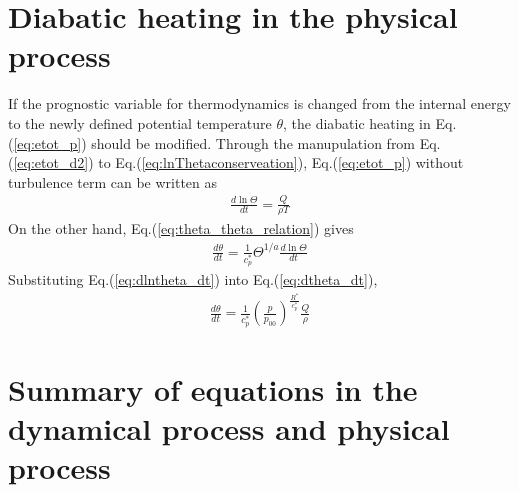 \section{Diabatic heating in the physical process}

If the prognostic variable for thermodynamics is changed
from the internal energy to the newly defined potential temperature $\theta$,
the diabatic heating in Eq.(\ref{eq:etot_p}) should be modified.
Through
the manupulation from Eq.(\ref{eq:etot_d2}) to Eq.(\ref{eq:lnThetaconserveation}),
Eq.(\ref{eq:etot_p}) without turbulence term can be written as
\begin{eqnarray}
  \frac{d \ln \Theta}{dt} = \frac{Q}{\rho T}
  \label{eq:dlntheta_dt}
\end{eqnarray}
On the other hand, Eq.(\ref{eq:theta_theta_relation}) gives
\begin{eqnarray}
  \frac{d \theta}{dt} = \frac{1}{c_p^*} \Theta^{1/a} \frac{d \ln \Theta}{dt}
  \label{eq:dtheta_dt}
\end{eqnarray}
Substituting Eq.(\ref{eq:dlntheta_dt}) into Eq.(\ref{eq:dtheta_dt}),
\begin{eqnarray}
  \frac{d \theta}{dt} = \frac{1}{c_p^*}
  \left(\frac{p}{p_{00}}\right)^{\frac{R^*}{c_p^*}} \frac{Q}{\rho}
\end{eqnarray}

\section{Summary of equations in the dynamical process and physical process}
